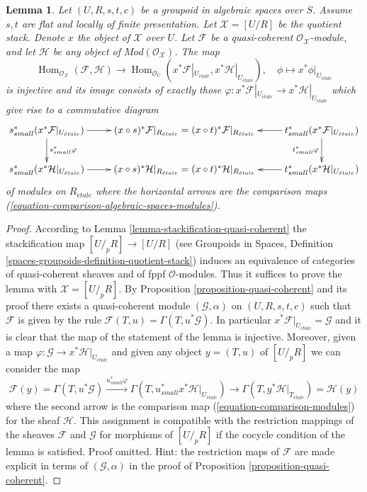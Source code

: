 \documentclass{stacks-project}
\theoremstyle{plain}
\newtheorem{lemma}[subsection]{Lemma}
\theoremstyle{definition}
\theoremstyle{remark}
\numberwithin{equation}{subsection}
\def\Hom{\mathop{\mathrm{Hom}}\nolimits}
\def\etale{{\acute{e}tale}}
\begin{document}
\begin{lemma}
\label{lemma-map-from-quasi-coherent}
Let $(U, R, s, t, c)$ be a groupoid in algebraic spaces over $S$.
Assume $s, t$ are flat and locally of finite presentation.
Let $\mathcal{X} = [U/R]$ be the quotient stack. Denote
$x$ the object of $\mathcal{X}$ over $U$.
Let $\mathcal{F}$ be a quasi-coherent
$\mathcal{O}_\mathcal{X}$-module, and let $\mathcal{H}$ be any object
of $\textit{Mod}(\mathcal{O}_\mathcal{X})$.
The map
$$
\Hom_{\mathcal{O}_\mathcal{X}}(\mathcal{F}, \mathcal{H})
\longrightarrow
\Hom_{\mathcal{O}_U}(x^*\mathcal{F}|_{U_\etale},
x^*\mathcal{H}|_{U_\etale}),
\quad
\phi \longmapsto x^*\phi|_{U_\etale}
$$
is injective and its image consists of exactly those
$\varphi : x^*\mathcal{F}|_{U_\etale} \to
x^*\mathcal{H}|_{U_\etale}$ which give rise to a commutative
diagram
$$
\xymatrix{
s_{small}^*(x^*\mathcal{F}|_{U_\etale})
\ar[r] \ar[d]^{s_{small}^*\varphi} &
(x \circ s)^*\mathcal{F}|_{R_\etale} =
(x \circ t)^*\mathcal{F}|_{R_\etale} &
t_{small}^*(x^*\mathcal{F}|_{U_\etale})
\ar[l] \ar[d]_{t_{small}^*\varphi} \\
s_{small}^*(x^*\mathcal{H}|_{U_\etale})
\ar[r] &
(x \circ s)^*\mathcal{H}|_{R_\etale} =
(x \circ t)^*\mathcal{H}|_{R_\etale} &
t_{small}^*(x^*\mathcal{H}|_{U_\etale})
\ar[l]
}
$$
of modules on $R_\etale$
where the horizontal arrows are the comparison maps
(\ref{equation-comparison-algebraic-spaces-modules}).
\end{lemma}

\begin{proof}
According to
Lemma \ref{lemma-stackification-quasi-coherent}
the stackification map $[U/_{\!p}R] \to [U/R]$ (see
Groupoids in Spaces, Definition
\ref{spaces-groupoids-definition-quotient-stack})
induces an equivalence of categories of quasi-coherent sheaves
and of fppf $\mathcal{O}$-modules.
Thus it suffices to prove the lemma with $\mathcal{X} = [U/_{\!p}R]$.
By Proposition \ref{proposition-quasi-coherent}
and its proof there exists a quasi-coherent module
$(\mathcal{G}, \alpha)$ on $(U, R, s, t, c)$ such that
$\mathcal{F}$ is given by the rule
$\mathcal{F}(T, u) = \Gamma(T, u^*\mathcal{G})$.
In particular $x^*\mathcal{F}|_{U_\etale} = \mathcal{G}$
and it is clear that the map of the statement of the
lemma is injective. Moreover, given a map
$\varphi : \mathcal{G} \to x^*\mathcal{H}|_{U_\etale}$
and given any object
$y = (T, u)$ of $[U/_{\!p}R]$ we can consider the map
$$
\mathcal{F}(y) = \Gamma(T, u^*\mathcal{G})
\xrightarrow{u_{small}^*\varphi}
\Gamma(T, u_{small}^*x^*\mathcal{H}|_{U_\etale})
\rightarrow
\Gamma(T, y^*\mathcal{H}|_{T_\etale}) = \mathcal{H}(y)
$$
where the second arrow is the comparison map
(\ref{equation-comparison-modules}) for the sheaf $\mathcal{H}$.
This assignment is compatible with the restriction mappings of the
sheaves $\mathcal{F}$ and $\mathcal{G}$ for morphisms of
$[U/_{\!p}R]$ if the cocycle condition of
the lemma is satisfied. Proof omitted. Hint: the restriction maps
of $\mathcal{F}$ are made explicit in terms of $(\mathcal{G}, \alpha)$
in the proof of
Proposition \ref{proposition-quasi-coherent}.
\end{proof}
\end{document}
